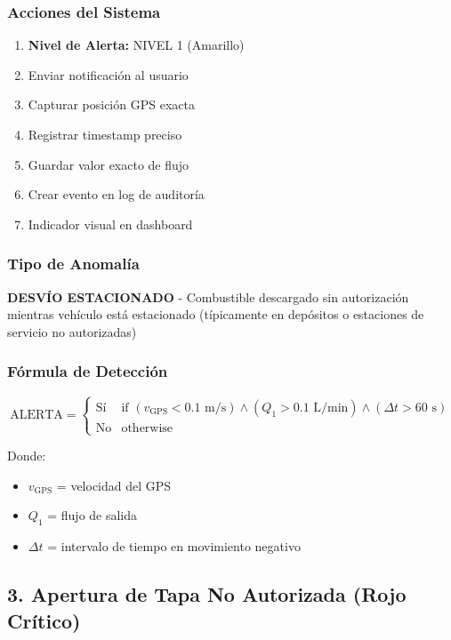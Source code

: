 \documentclass[12pt,a4paper,oneside]{report}
\begin{document}
\subsubsection{Acciones del Sistema}

\begin{enumerate}
    \item \textbf{Nivel de Alerta:} NIVEL 1 (Amarillo)
    \item Enviar notificación al usuario
    \item Capturar posición GPS exacta
    \item Registrar timestamp preciso
    \item Guardar valor exacto de flujo
    \item Crear evento en log de auditoría
    \item Indicador visual en dashboard
\end{enumerate}

\subsubsection{Tipo de Anomalía}

\textbf{DESVÍO ESTACIONADO} - Combustible descargado sin autorización mientras vehículo está estacionado (típicamente en depósitos o estaciones de servicio no autorizadas)

\subsubsection{Fórmula de Detección}

\[
\text{ALERTA} = \begin{cases}
\text{Sí} & \text{if } (v_{\text{GPS}} < 0.1 \text{ m/s}) \land (Q_1 > 0.1 \text{ L/min}) \land (\Delta t > 60 \text{ s}) \\
\text{No} & \text{otherwise}
\end{cases}
\]

Donde:
\begin{itemize}
    \item $v_{\text{GPS}}$ = velocidad del GPS
    \item $Q_1$ = flujo de salida
    \item $\Delta t$ = intervalo de tiempo en movimiento negativo
\end{itemize}

\subsection{3. Apertura de Tapa No Autorizada (Rojo Crítico)}
\end{document}
